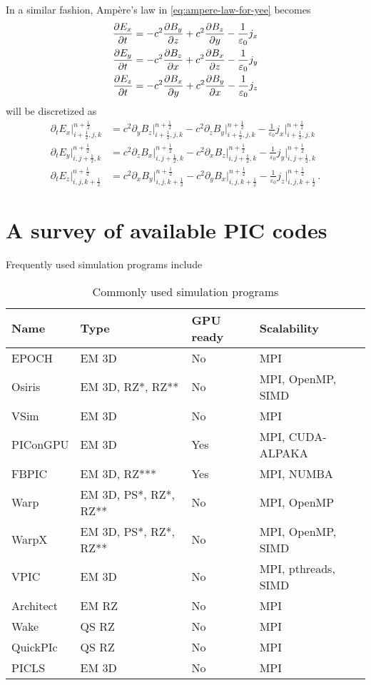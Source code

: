 \documentclass[12pt, class=report, crop=false]{standalone}
\begin{document}
In a similar fashion, Ampère's law in \cref{eq:ampere-law-for-yee} becomes
\begin{align*}
  \pdv{E_x}{t} &= -c^2 \pdv{B_y}{z} + c^2 \pdv{B_z}{y} - \frac{1}{\varepsilon_0} j_x \\
  \pdv{E_y}{t} &= -c^2 \pdv{B_z}{x} + c^2 \pdv{B_x}{z} - \frac{1}{\varepsilon_0} j_y \\
  \pdv{E_z}{t} &= -c^2 \pdv{B_x}{y} + c^2 \pdv{B_y}{x} - \frac{1}{\varepsilon_0} j_z
\end{align*}
will be discretized as
\begin{align*}
  \partial_t E_x \rvert^{n+\frac{1}{2}}_{i+\frac{1}{2},j,k} &=
  c^2\partial_y B_z \rvert^{n+\frac{1}{2}}_{i+\frac{1}{2},j,k}
  -c^2\partial_z B_y \rvert^{n+\frac{1}{2}}_{i+\frac{1}{2},j,k}
  -\frac{1}{\varepsilon_0} j_x \rvert^{n+\frac{1}{2}}_{i+\frac{1}{2},j,k} \\
  \partial_t E_y \rvert^{n+\frac{1}{2}}_{i,j+\frac{1}{2},k} &=
  c^2\partial_z B_x \rvert^{n+\frac{1}{2}}_{i,j+\frac{1}{2},k}
  -c^2\partial_x B_z \rvert^{n+\frac{1}{2}}_{i,j+\frac{1}{2},k}
  -\frac{1}{\varepsilon_0} j_y \rvert^{n+\frac{1}{2}}_{i,j+\frac{1}{2},k} \\
  \partial_t E_z \rvert^{n+\frac{1}{2}}_{i,j,k+\frac{1}{2}} &=
  c^2\partial_x B_y \rvert^{n+\frac{1}{2}}_{i,j,k+\frac{1}{2}}
  -c^2\partial_y B_x \rvert^{n+\frac{1}{2}}_{i,j,k+\frac{1}{2}}
  -\frac{1}{\varepsilon_0} j_z \rvert^{n+\frac{1}{2}}_{i,j,k+\frac{1}{2}} \,.
\end{align*}

\section{A survey of available PIC codes}

Frequently used simulation programs include

\begin{table}
  \begin{tabular}{l l l l}
  \toprule
  \textbf{Name} & \textbf{Type} & \textbf{GPU ready} & \textbf{Scalability}\\
  \midrule
  EPOCH & EM 3D & No & MPI\\
  Osiris & EM 3D, RZ*, RZ** & No & MPI, OpenMP, SIMD\\
  VSim & EM 3D & No & MPI\\
  PIConGPU & EM 3D & Yes & MPI, CUDA-ALPAKA\\
  FBPIC & EM 3D, RZ*** & Yes & MPI, NUMBA\\
  Warp & EM 3D, PS*, RZ*, RZ** & No & MPI, OpenMP\\
  WarpX & EM 3D, PS*, RZ*, RZ** & No & MPI, OpenMP, SIMD\\
  VPIC & EM 3D & No & MPI, pthreads, SIMD\\
  Architect & EM RZ & No & MPI\\
  Wake & QS RZ & No & MPI\\
  QuickPIc & QS RZ & No & MPI\\
  PICLS & EM 3D & No & MPI\\
  \bottomrule
  \end{tabular}
  \caption{Commonly used simulation programs}%
  \label{tab:pic-software}
\end{table}
\end{document}
